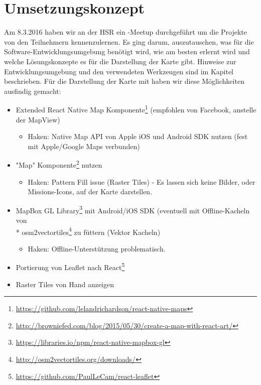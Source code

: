 \chapter{Umsetzungskonzept}
\label{tb-umsetzungskonzept}
Am 8.3.2016 haben wir an der HSR ein -Meetup durchgeführt um die Projekte von den Teilnehmern kennenzulernen. 
Es ging darum, auszutauschen, was für die Software-Entwicklungsumgebung benötigt wird, wie  am besten erlernt wird und welche Lösungskonzepte es für die Darstellung der Karte gibt.
Hinweise zur Entwicklungsumgebung und den verwendeten Werkzeugen sind im Kapitel  beschrieben.
Für die Darstellung der Karte mit  haben wir diese Möglichkeiten ausfindig gemacht:

\begin{itemize}
    \item Extended React Native Map Komponente\footnote{\url{https://github.com/lelandrichardson/react-native-maps}} (empfohlen von Facebook, anstelle der MapView)
    \begin{itemize}
    	\item Haken: Native Map API von Apple iOS und Android SDK nutzen (fest mit Apple/Google Maps verbunden)
	\end{itemize}
	
    \item {} "Map" Komponente\footnote{\url{http://browniefed.com/blog/2015/05/30/create-a-map-with-react-art/}} nutzen
    \begin{itemize}
    	\item Haken: Pattern Fill issue (Raster Tiles) - Es lassen sich keine Bilder, oder Missions-Icons, auf der Karte darstellen.
	\end{itemize}     

    \item MapBox GL Library\footnote{\url{https://libraries.io/npm/react-native-mapbox-gl}} mit Android/iOS SDK  (eventuell mit Offline-Kacheln von\\* osm2vectortiles\footnote{\url{http://osm2vectortiles.org/downloads/}} zu füttern (Vektor Kacheln)
    \begin{itemize}
    	\item Haken: Offline-Unterstützung problematisch.
	\end{itemize}   
	
    \item Portierung von Leaflet nach React\footnote{\url{https://github.com/PaulLeCam/react-leaflet}}
    \item Raster Tiles von Hand anzeigen
\end{itemize}

